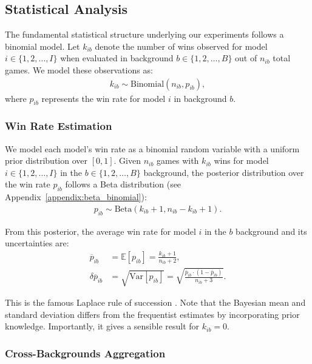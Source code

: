 \documentclass[sigconf,anonymous,balance=false]{aamas}
\begin{document}
\subsection{Statistical Analysis}

The fundamental statistical structure underlying our experiments follows a binomial model. Let $k_{ib}$ denote the number of wins observed for model $i\in\{1,2,\dots,I\}$ when evaluated in background $b\in\{1,2,\dots,B\}$ out of $n_{ib}$ total games. We model these observations as:
\begin{align}
    k_{ib} \sim \text{Binomial}(n_{ib}, p_{ib}),
\end{align}
where $p_{ib}$ represents the win rate for model $i$ in background $b$.

\subsubsection{Win Rate Estimation}
\label{sec:win_rate_estimation}

We model each model's win rate as a binomial random variable with a uniform prior distribution over $[0,1]$. Given $n_{ib}$ games with $k_{ib}$ wins for model $i\in\{1,2,\dots,I\}$ in the $b\in\{1,2,\dots,B\}$ background, the posterior distribution over the win rate $p_{ib}$ follows a Beta distribution (see Appendix~\ref{appendix:beta_binomial}):
\begin{align}
p_{ib}\sim \text{Beta}(k_{ib} + 1, n_{ib} - k_{ib} + 1).
\end{align}

From this posterior, the average win rate for model $i$ in the $b$ background and its uncertainties are:
\begin{align}
\overline{p}_{ib} & = \mathbb{E}[p_{ib}] = \frac{k_{ib} + 1}{n_{ib} + 2} \label{eq:binomial_background},\\
\delta\overline{p}_{ib} & =\sqrt{\textrm{Var}[p_{ib}]} = \sqrt{\frac{\overline{p}_{ib} \cdot (1 - \overline{p}_{ib})}{n_{ib} + 3}}.
\label{uncertainty}
\end{align}

This is the famous Laplace rule of succession \cite{Laplace1812}. Note that the Bayesian mean and standard deviation differs from the frequentist estimates by incorporating prior knowledge. Importantly, it gives a sensible result for $k_{ib}=0$.


\subsubsection{Cross-Backgrounds Aggregation}
\label{sec:aggregating_accross_backgrounds}
\end{document}
